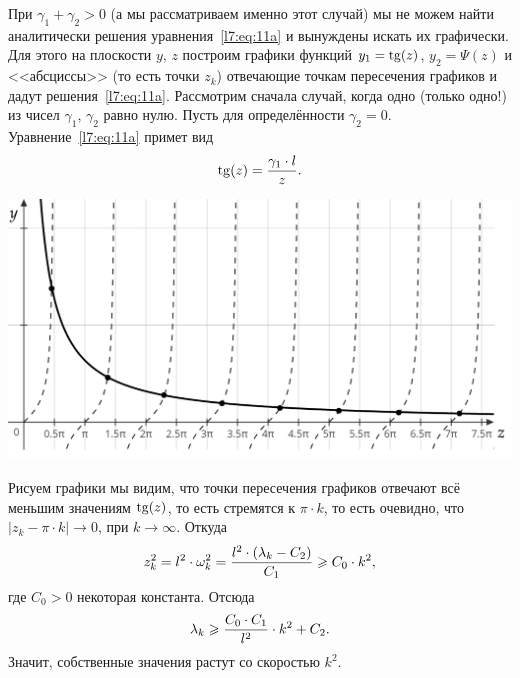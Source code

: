 \noindent При $\gamma_1+\gamma_2>0$ (а мы рассматриваем именно этот случай) мы не можем найти аналитически решения уравнения~\eqref{l7:eq:11a} и вынуждены искать их графически. Для этого на плоскости $y,\,z$ построим графики функций $y_1=\operatorname{tg}(z)$, $y_2=\Psi(z)$ и  <<абсциссы>> (то есть точки $z_k$) отвечающие точкам пересечения графиков и дадут решения~\eqref{l7:eq:11a}. Рассмотрим сначала случай, когда одно (только одно!) из чисел $\gamma_1,\,\gamma_2$ равно нулю. Пусть для определённости $\gamma_2=0$. Уравнение~\eqref{l7:eq:11a} примет вид
\begin{equation*}
	\hfill\Tang(z)=\dfrac{\gamma_1\cdot l}{z}.\hfill
\end{equation*}
\begin{center}
	\includegraphics[width=0.7\linewidth]{picture1}
\end{center}
Рисуем графики мы видим, что точки пересечения графиков отвечают всё меньшим значениям $\operatorname{tg}(z)$, то есть стремятся к $\pi\cdot k$, то есть очевидно, что $|z_k-\pi\cdot  k|\to0$, при $k\to\infty$. Откуда
\begin{equation*}
	\hfill z_k^2=l^2\cdot\omega_k^2=\dfrac{l^2\cdot(\lambda_k-C_2)}{C_1}\geqslant C_0\cdot k^2,\hfill
\end{equation*}	
где $C_0>0$ некоторая константа. Отсюда
\begin{equation*}
	\hfill\lambda_k\geqslant\frac{C_0\cdot C_1}{l^2}\cdot k^2+C_2.\hfill
\end{equation*}
Значит, собственные значения растут со скоростью $k^2$.

